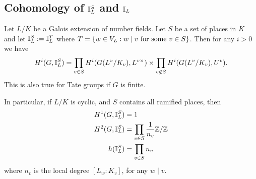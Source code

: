 \subsection{Cohomology of $\mathbb{I}_L^S$ and $\mathbb{I}_L$}
\begin{pr}
Let $L/K$ be a Galois extension of number fields.
Let $S$ be a set of places in $K$ 
and let $\mathbb{I}_L^S:=\mathbb{I}_L^T$ where 
$T=\left\{{w\in V_L}:{w\mid v\text{ for some }v\in S}\right\}$.
Then for any $i>0$ we have
\[
H^i(G, \mathbb{I}_L^S)=\prod_{v\in S} H^i(G(L^v/K_v),L^{v\times})\times \prod_{v\not\in S} H^i(G(L^v/K_v),U^v).
\]
This is also true for Tate groups if $G$ is finite.

In particular, if $L/K$ is cyclic, and $S$ contains all ramified places, then
\begin{align*}
H^1(G, \mathbb{I}_L^S)&=1\\
H^2(G, \mathbb{I}_L^S)&=\prod_{v\in S}\frac{1}{n_v} \mathbb{Z}/\mathbb{Z}\\
h(\mathbb{I}_L^S)&=\prod_{v\in S} n_v
\end{align*}
where %
$n_v$ is the local degree $[L_w:K_v]$, for any $w\mid v$.
\end{pr}
